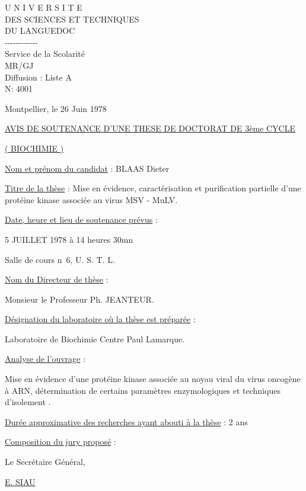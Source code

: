 \begin{center}
U N I V E R S I T E\\
DES SCIENCES ET TECHNIQUES\\
DU LANGUEDOC\\
-{}-{}-{}-{}-{}-{}-{}-{}-{}-{}-{}-\\
Service de la Scolarité\\
MR/GJ\\
Diffusion : Liste A\\
N\textdegree: 4001
\end{center}
Montpellier, le 26 Juin 1978

\begin{center}
\uline{AVIS DE SOUTENANCE D'UNE THESE DE DOCTORAT DE 3ème CYCLE}

\uline{( BIOCHIMIE )}
\end{center}

\uline{Nom et prénom du candidat} : BLAAS Dieter

\uline{Titre de la thèse} : Mise en évidence, caractérisation et purification partielle
d'une protéine kinase associée au virus MSV - MuLV.

\uline{Date, heure et lieu de soutenance prévus} :

5 JUILLET 1978 à 14 heures 30mn

Salle de cours n\textdegree\ 6, U. S. T. L.

\uline{Nom du Directeur de thèse} :

Monsieur le Professeur Ph. JEANTEUR.

\uline{Désignation du laboratoire où la thèse est préparée} :

Laboratoire de Biochimie Centre Paul Lamarque.

\uline{Analyse de l'ouvrage} :

Mise en évidence d'une protéine kinase associée au noyau viral
du virus oncogène à ARN, détermination de certains paramètres enzymologiques et
techniques d'isolement .

\uline{Durée approximative des recherches ayant abouti à la thèse} : 2 ans

\uline{Composition du jury proposé} :


Le Secrétaire Général,


\uline{E. SIAU}

